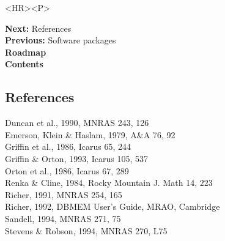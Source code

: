 \documentclass[11pt]{article}
\newcommand{\htmlref}[2]{#1}
\newcommand{\xlabel}[1]{}
\begin{document}
\begin{htmlonly}
\begin{rawhtml} <HR><P> \end{rawhtml}
{\bf \htmlref{Next:}{refer}} References\\
{\bf \htmlref{Previous:}{packs}} Software packages\\
{\bf \htmlref{Roadmap}{roadmap}}\\
{\bf \htmlref{Contents}{stardoccontents}}\\
\end{htmlonly}


\subsection{\label{refer}\xlabel{refer}References}

Duncan et al., 1990, MNRAS 243, 126\\
Emerson, Klein \& Haslam, 1979, A\&A 76, 92\\
Griffin et al., 1986, Icarus  65, 244\\
Griffin \& Orton, 1993, Icarus 105, 537\\
Orton et al., 1986, Icarus 67, 289\\
Renka \& Cline, 1984, Rocky Mountain J. Math 14, 223\\
Richer, 1991, MNRAS 254, 165\\
Richer, 1992, DBMEM User's Guide, MRAO, Cambridge\\
Sandell, 1994, MNRAS 271, 75\\
Stevens \& Robson, 1994, MNRAS 270, L75\\
\end{document}
